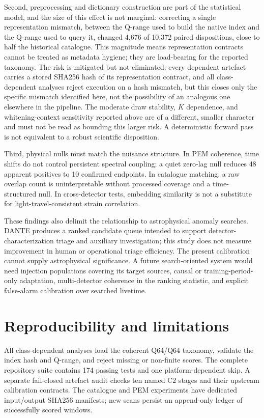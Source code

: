 \documentclass[12pt]{article}
\begin{document}
Second, preprocessing and dictionary construction are part of the statistical
model, and the size of this effect is not marginal: correcting a single
representation mismatch, between the Q-range used to build the native index
and the Q-range used to query it, changed 4,676 of 10,372 paired dispositions,
close to half the historical catalogue. This magnitude means representation
contracts cannot be treated as metadata hygiene; they are load-bearing for the
reported taxonomy. The risk is mitigated but not eliminated: every dependent
artefact carries a stored SHA256 hash of its representation contract, and all
class-dependent analyses reject execution on a hash mismatch, but this closes
only the specific mismatch identified here, not the possibility of an
analogous one elsewhere in the pipeline. The moderate draw stability, $K$
dependence, and whitening-context sensitivity reported above are of a
different, smaller character and must not be read as bounding this larger
risk. A deterministic forward pass is not equivalent to a robust scientific
disposition.

Third, physical nulls must match the nuisance structure.  In PEM coherence,
time shifts do not control persistent spectral coupling; a quiet zero-lag null
reduces 48 apparent positives to 10 confirmed endpoints.  In catalogue
matching, a raw overlap count is uninterpretable without processed coverage
and a time-structured null.  In cross-detector tests, embedding similarity is
not a substitute for light-travel-consistent strain correlation.

These findings also delimit the relationship to astrophysical anomaly
searches.  DANTE produces a ranked candidate queue intended to support
detector-characterization triage and auxiliary investigation; this study does
not measure improvement in human or operational triage efficiency.  The present calibration cannot supply astrophysical
significance.  A future search-oriented system would need injection populations
covering its target sources, causal or training-period-only adaptation,
multi-detector coherence in the ranking statistic, and explicit false-alarm
calibration over searched livetime.

\section{Reproducibility and limitations}

All class-dependent analyses load the coherent Q64/Q64 taxonomy, validate the
index hash and Q-range, and reject missing
or non-finite scores. The complete repository suite contains 174 passing tests
and one platform-dependent skip.
A separate
fail-closed artefact audit checks ten named C2 stages and their upstream
calibration contracts.  The catalogue and PEM experiments have dedicated
input/output SHA256 manifests; new scans persist an append-only ledger of
successfully scored windows.
\end{document}
